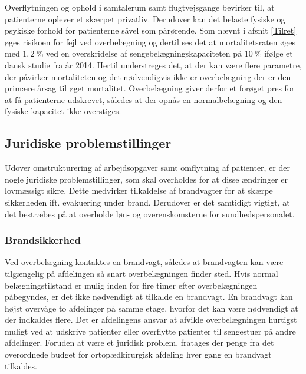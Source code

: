 Overflytningen og ophold i samtalerum samt flugtvejsgange bevirker til, at patienterne oplever et skærpet privatliv. \cite{Madsen2014} Derudover kan det belaste fysiske og psykiske forhold for patienterne såvel som pårørende. \cite{Heidmann2014} Som nævnt i afsnit \ref{Tilret} øges risikoen for fejl ved overbelægning og dertil ses det at mortalitetsraten øges med $1,2~\%$ ved en overskridelse af sengebelægningskapaciteten på $10~\%$ ifølge et dansk studie fra år 2014. \cite{Madsen2014} Hertil understreges det, at der kan være flere parametre, der påvirker mortaliteten og det nødvendigvis ikke er overbelægning der er den primære årsag til øget mortalitet. Overbelægning giver derfor et forøget pres for at få patienterne udskrevet, således at der opnås en normalbelægning og  den fysiske kapacitet ikke overstiges.  

 
\subsection{Juridiske problemstillinger}
Udover omstrukturering af arbejdsopgaver samt omflytning af patienter, er der nogle juridiske problemstillinger, som skal overholdes for at disse ændringer er lovmæssigt sikre. Dette medvirker tilkaldelse af brandvagter for at skærpe sikkerheden ift. evakuering under brand. Derudover er det samtidigt vigtigt, at det bestræbes på at overholde løn- og overenskomsterne for sundhedspersonalet.

\subsubsection{Brandsikkerhed}
Ved overbelægning kontaktes en brandvagt, således at brandvagten kan være tilgængelig på afdelingen så snart overbelægningen finder sted. Hvis normal belægningstilstand er mulig inden for fire timer efter overbelægningen påbegyndes, er det ikke nødvendigt at tilkalde en brandvagt. En brandvagt kan højst overvåge to afdelinger på samme etage, hvorfor det kan være nødvendigt at der indkaldes flere. Det er afdelingens ansvar at afvikle overbelægningen hurtigst muligt ved at udskrive patienter eller overflytte patienter til sengestuer på andre afdelinger. \cite{Beredskab2016} Foruden at være et juridisk problem, fratages der penge fra det overordnede budget for ortopædkirurgisk afdeling hver gang en brandvagt tilkaldes.  

